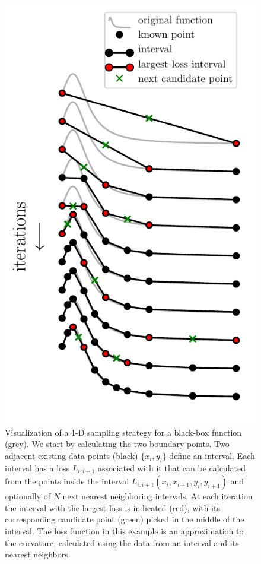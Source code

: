 \documentclass[english, twocolumn, 10pt, aps, superscriptaddress, floatfix, prb, citeautoscript]{revtex4-1}
\begin{document}
\begin{figure}
\centering
\includegraphics{figures/algo.pdf}
\caption{Visualization of a 1-D sampling strategy for a black-box function (grey).
We start by calculating the two boundary points.
Two adjacent existing data points (black) \(\{x_i, y_i\}\) define an interval.
Each interval has a loss \(L_{i,i+1}\) associated with it that can be calculated from the points inside the interval \(L_{i,i+1}(x_i, x_{i+1}, y_i, y_{i+1})\) and optionally of \(N\) next nearest neighboring intervals.
At each iteration the interval with the largest loss is indicated (red), with its corresponding candidate point (green) picked in the middle of the interval.
The loss function in this example is an approximation to the curvature, calculated using the data from an interval and its nearest neighbors.\label{fig:algo}}
\end{figure}
\end{document}

